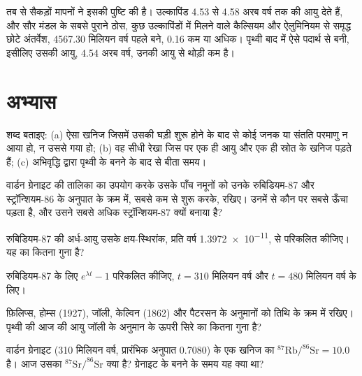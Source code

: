 तब से सैकड़ों मापनों ने इसकी पुष्टि की है। उल्कापिंड
4.53 से 4.58 अरब वर्ष तक की आयु देते हैं, और सौर मंडल के सबसे पुराने ठोस,
कुछ उल्कापिंडों में मिलने वाले कैल्सियम और ऐलुमिनियम से समृद्ध छोटे अंतर्वेश,
\num{4567.30} मिलियन वर्ष पहले बने, 0.16 कम या अधिक। पृथ्वी
बाद में ऐसे पदार्थ से बनी, इसीलिए उसकी आयु, 4.54 अरब वर्ष, उनकी आयु से
थोड़ी कम है।

\section{अभ्यास}

\begin{exercise}[$\star$]\label{exo:g12:age-of-the-earth:1}
शब्द बताइए: (a) ऐसा खनिज जिसमें उसकी घड़ी शुरू होने के बाद से कोई जनक या संतति परमाणु
न आया हो, न उससे गया हो; (b) वह सीधी रेखा जिस पर एक ही आयु और एक ही स्रोत के
खनिज पड़ते हैं; (c) अभिवृद्धि द्वारा पृथ्वी के बनने के बाद से बीता
समय।
\end{exercise}

\begin{exercise}[$\star$]\label{exo:g12:age-of-the-earth:2}
वार्डन ग्रेनाइट की तालिका का उपयोग करके उसके पाँच नमूनों को उनके
रुबिडियम-87 और स्ट्रॉन्शियम-86 के अनुपात के क्रम में, सबसे कम से शुरू करके, रखिए। उनमें से कौन
 पर सबसे ऊँचा पड़ता है, और उसने सबसे अधिक स्ट्रॉन्शियम-87 क्यों बनाया है?
\end{exercise}

\begin{exercise}[$\star$]\label{exo:g12:age-of-the-earth:3}
रुबिडियम-87 की अर्ध-आयु उसके क्षय-स्थिरांक,
प्रति वर्ष \num{1.3972e-11}, से परिकलित कीजिए। यह  का कितना गुना है?
\end{exercise}

\begin{exercise}[$\star$]\label{exo:g12:age-of-the-earth:4}
रुबिडियम-87 के लिए $e^{\lambda t} - 1$ परिकलित कीजिए, $t = 310$ मिलियन वर्ष और
$t = 480$ मिलियन वर्ष के लिए।
\end{exercise}

\begin{exercise}[$\star$]\label{exo:g12:age-of-the-earth:5}
फ़िलिप्स, होम्स (1927), जॉली, केल्विन
(1862) और पैटरसन के अनुमानों को तिथि के क्रम में रखिए। पृथ्वी की आज की आयु जॉली के
अनुमान के ऊपरी सिरे का कितना गुना है?
\end{exercise}

\begin{exercise}[$\star\star$]\label{exo:g12:age-of-the-earth:6}
वार्डन ग्रेनाइट (310 मिलियन वर्ष, प्रारंभिक अनुपात 0.7080) के एक खनिज का
$^{87}\mathrm{Rb}/^{86}\mathrm{Sr} = 10.0$ है। आज उसका
$^{87}\mathrm{Sr}/^{86}\mathrm{Sr}$ क्या है? ग्रेनाइट के बनने के समय यह क्या
था?
\end{exercise}

